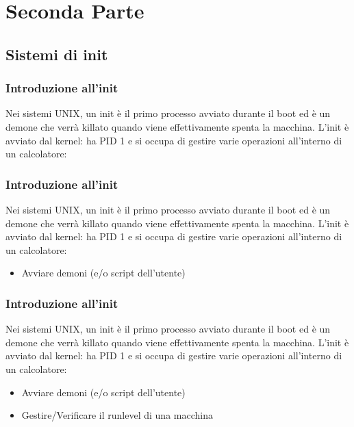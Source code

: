 \documentclass{beamer}
\begin{document}
\section{Seconda Parte}
\subsection{Sistemi di init}

\begin{frame}
\frametitle{Introduzione all'init}
Nei sistemi UNIX, un init \`e il primo processo avviato durante il boot ed \`e un demone che verr\`a killato quando viene effettivamente spenta la macchina. L'init \`e avviato dal kernel: ha PID 1 e si occupa di gestire varie operazioni all'interno di un calcolatore:
\end{frame}


\begin{frame}
	\frametitle{Introduzione all'init}
	Nei sistemi UNIX, un init \`e il primo processo avviato durante il boot ed \`e un demone che verr\`a killato quando viene effettivamente spenta la macchina. L'init \`e avviato dal kernel: ha PID 1 e si occupa di gestire varie operazioni all'interno di un calcolatore:
 	\begin{itemize}
		\item Avviare demoni (e/o script dell'utente)
	\end{itemize}
\end{frame}


\begin{frame}
	\frametitle{Introduzione all'init}
	Nei sistemi UNIX, un init \`e il primo processo avviato durante il boot ed \`e un demone che verr\`a killato quando viene effettivamente spenta la macchina. L'init \`e avviato dal kernel: ha PID 1 e si occupa di gestire varie operazioni all'interno di un calcolatore:
	\begin{itemize}
		\item Avviare demoni (e/o script dell'utente)
		\item Gestire/Verificare il runlevel di una macchina
	\end{itemize}
\end{frame}

\end{document}

